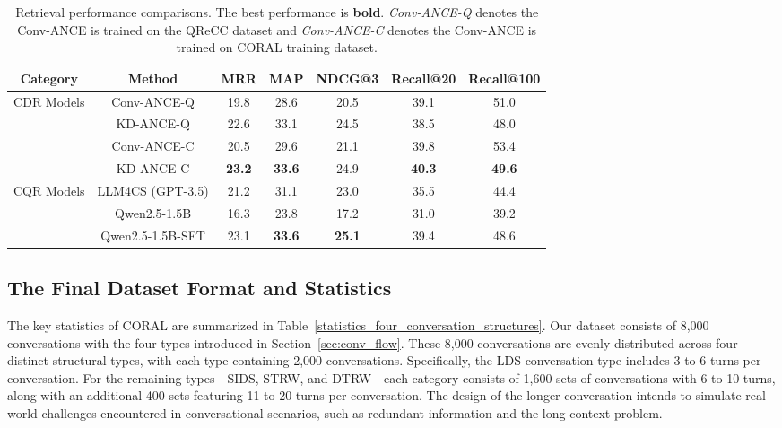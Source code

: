 \documentclass[11pt]{article}
\begin{document}


\begin{table}[htbp]
    \centering
    \setlength{\tabcolsep}{12pt}
    \small %
    \begin{tabular}{@{}ccccccc@{}}
        \toprule
        Category & Method & MRR & MAP & NDCG@3 & Recall@20 & Recall@100 \\
        \midrule
        
        \multirow{4}{*}{CDR Models} &Conv-ANCE-Q & 19.8 & 28.6 & 20.5 & 39.1 & 51.0 \\
        &KD-ANCE-Q & 22.6 & 33.1 & 24.5 & 38.5 & 48.0 \\
        &Conv-ANCE-C & 20.5 & 29.6 & 21.1 & 39.8 & 53.4 \\
        &KD-ANCE-C & \textbf{23.2} & \textbf{33.6} & 24.9 & \textbf{40.3} &\textbf{49.6} \\
        
        \midrule
        \multirow{3}{*}{CQR Models} &LLM4CS (GPT-3.5) & 21.2 & 31.1 & 23.0 & 35.5 &44.4 \\
        &Qwen2.5-1.5B & 16.3 & 23.8 & 17.2 & 31.0 & 39.2 \\
        &Qwen2.5-1.5B-SFT & 23.1 & \textbf{33.6} & \textbf{25.1} & 39.4 &48.6 \\
        \bottomrule
    \end{tabular}
    \caption{Retrieval performance comparisons. The best performance is \textbf{bold}.
    \textit{Conv-ANCE-Q} denotes the Conv-ANCE is trained on the QReCC dataset and \textit{Conv-ANCE-C} denotes the Conv-ANCE is trained on CORAL training dataset.}
    \label{conversational_search_performances}
\end{table}


\subsection{The Final Dataset Format and Statistics}
The key statistics of CORAL are summarized in Table~\ref{statistics_four_conversation_structures}. Our dataset consists of 8,000 conversations with the four types introduced in Section~\ref{sec:conv_flow}. These 8,000 conversations are evenly distributed across four distinct structural types, with each type containing 2,000 conversations. Specifically, the LDS conversation type includes 3 to 6 turns per conversation. For the remaining types—SIDS, STRW, and DTRW—each category consists of 1,600 sets of conversations with 6 to 10 turns, along with an additional 400 sets featuring 11 to 20 turns per conversation. The design of the longer conversation intends to simulate real-world challenges encountered in conversational scenarios, such as redundant information and the long context problem. 
\end{document}
